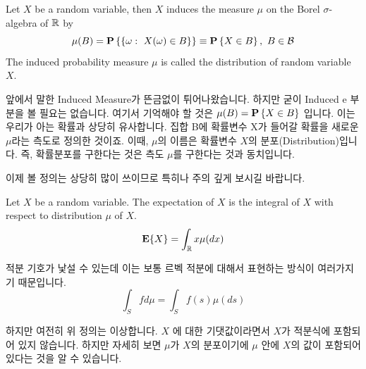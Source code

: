 \documentclass[final]{IEEEphot}
\begin{document}
\begin{definition}
	Let $X$ be a random variable, then $X$ induces the measure $\mu$ on the Borel $\sigma$-algebra of $\mathbb{R}$ by
	$$\mu(B) = \mathbf{P} \left\{ \{\omega:~ X(\omega)\in B\} \right\} \equiv \mathbf{P} \left\{ X\in B \right\}, ~ B \in \mathcal{B}$$
	The induced probability measure $\mu$ is called the distribution of random variable $X$.
	
	\HL
\end{definition}

앞에서 말한 Induced Measure가 뜬금없이 튀어나왔습니다. 하지만 굳이 Induced e 부분을 볼 필요는 없습니다. 여기서 기억해야 할 것은 $\mu(B) = \mathbf{P} \left\{ X \in B \right\}$ 입니다. 이는 우리가 아는 확률과 상당히 유사합니다. 집합 B에 확률변수 X가 들어갈 확률을 새로운 $\mu$라는 측도로 정의한 것이죠. 이때, $\mu$의 이름은 확률변수 $X$의 분포(Distribution)입니다. 즉, 확률분포를 구한다는 것은 측도 $\mu$를 구한다는 것과 동치입니다.

\VS

\HS 이제 볼 정의는 상당히 많이 쓰이므로 특히나 주의 깊게 보시길 바랍니다.

\begin{definition}[Expectation]
	Let $X$ be a random variable. The expectation of $X$ is the integral of $X$ with respect to distribution $\mu$ of $X$.
	$$ \mathbf{E}\{X\} = \int_{\mathbb{R}} x \mu(dx)$$
	
	\HL
\end{definition}

적분 기호가 낯설 수 있는데 이는 보통 르벡 적분에 대해서 표현하는 방식이 여러가지기 때문입니다.
$$\int_S f d\mu = \int_S f(s) \mu(ds) $$

하지만 여전히 위 정의는 이상합니다. $X$ 에 대한 기댓값이라면서 $X$가 적분식에 포함되어 있지 않습니다. 하지만 자세히 보면 $\mu$가 $X$의 분포이기에 $\mu$ 안에 $X$의 값이 포함되어 있다는 것을 알 수 있습니다.


%
%


\end{document}
